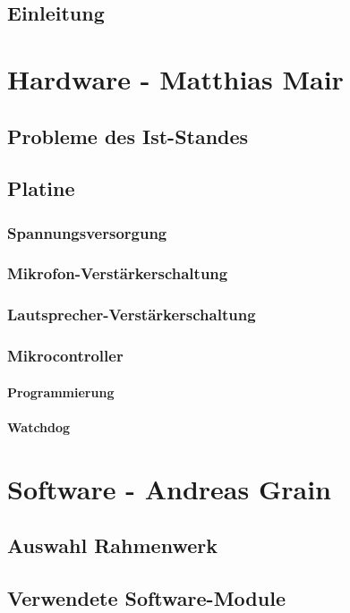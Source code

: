 \documentclass[a4paper, 12pt, twoside, openright
]{memoir}
\newcommand{\AndreasGrain}{Andreas Grain}
\newcommand{\MatthiasMair}{Matthias Mair}
\newcommand{\authorName}{\AndreasGrain / \MatthiasMair}
\begin{document}
\mainmatter
\chapter{Einleitung}

\cleartoverso

\renewcommand{\authorName}{\MatthiasMair}
\part{Hardware - \MatthiasMair}
\chapter{Probleme des Ist-Standes}
\chapter{Platine}
\section{Spannungsversorgung}
\section{Mikrofon-Verstärkerschaltung}
\section{Lautsprecher-Verstärkerschaltung}
\section{Mikrocontroller}
\subsection{Programmierung}
\subsection{Watchdog}
\cleartoverso

\renewcommand{\authorName}{\AndreasGrain}
\part{Software - \AndreasGrain}
\chapter{Auswahl Rahmenwerk}

\chapter{Verwendete Software-Module}

\end{document}
